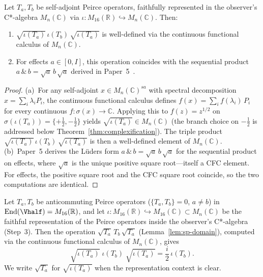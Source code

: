 \begin{lemma}\label{lem:sp-domain}
Let $T_a, T_b$ be self-adjoint Peirce operators, faithfully represented
in the observer's C*-algebra $M_n(\mathbb{C})$ via
$\iota\colon M_{16}(\mathbb{R})\hookrightarrow M_n(\mathbb{C})$.
Then:
\begin{enumerate}
  \item[\textup{(a)}] $\sqrt{\iota(T_a)}\,\iota(T_b)\,\sqrt{\iota(T_a)}$
    is well-defined via the continuous functional calculus of
    $M_n(\mathbb{C})$.
  \item[\textup{(b)}] For effects $a \in [0,I]$, this operation coincides
    with the sequential product $a\,\&\,b = \sqrt{a}\,b\,\sqrt{a}$
    derived in Paper~5~\cite{Paper5}.
\end{enumerate}
\end{lemma}

\begin{proof}
(a)~For any self-adjoint $x \in M_n(\mathbb{C})^{sa}$ with spectral
decomposition $x = \sum_i \lambda_i P_i$, the continuous functional
calculus defines $f(x) = \sum_i f(\lambda_i)\,P_i$ for every
continuous $f\colon\sigma(x)\to\mathbb{C}$.  Applying this to
$f(z) = z^{1/2}$ on $\sigma(\iota(T_a)) = \{+\tfrac{1}{2},
-\tfrac{1}{2}\}$ yields $\sqrt{\iota(T_a)} \in M_n(\mathbb{C})$
(the branch choice on $-\tfrac{1}{2}$ is addressed below
Theorem~\ref{thm:complexification}).  The triple product
$\sqrt{\iota(T_a)}\,\iota(T_b)\,\sqrt{\iota(T_a)}$ is then
a well-defined element of $M_n(\mathbb{C})$.
(b)~Paper~5 derives the L\"uders form
$a\,\&\,b = \sqrt{a}\,b\,\sqrt{a}$ for the sequential product
on effects, where $\sqrt{a}$ is the unique positive square root---itself
a CFC element.  For effects, the positive square root and the CFC
square root coincide, so the two computations are identical.
\end{proof}

\begin{theorem}\label{thm:complexification}
Let $T_a, T_b$ be anticommuting Peirce operators
($\{T_a, T_b\} = 0$, $a \neq b$) in
$\mathrm{End}(\Vhalf) = M_{16}(\mathbb{R})$, and let
$\iota\colon M_{16}(\mathbb{R})\hookrightarrow M_{16}(\mathbb{C})
\subset M_n(\mathbb{C})$ be the faithful representation of the Peirce
operators inside the observer's C*-algebra (Step~3).  Then the
operation $\sqrt{T_a}\,T_b\,\sqrt{T_a}$
(Lemma~\ref{lem:sp-domain}), computed via the continuous functional
calculus of $M_n(\mathbb{C})$, gives
\begin{equation}\label{eq:sp-complex}
  \sqrt{\iota(T_a)}\;\iota(T_b)\;\sqrt{\iota(T_a)}
  = \frac{i}{2}\,\iota(T_b).
\end{equation}
We write $\sqrt{T_a}$ for $\sqrt{\iota(T_a)}$ when the representation
context is clear.
\end{theorem}

